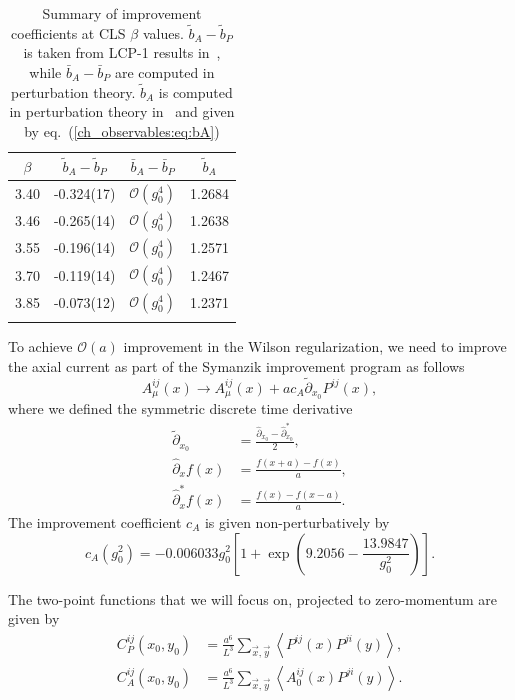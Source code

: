 \begin{longtable}{c c c c}
    \label{ch_observables:tab:b}
    $\beta$ & $\tilde{b}_A-\tilde{b}_P$ & $\bar{b}_A-\bar{b}_P$ & $\tilde{b}_A$ \\
    \toprule
    3.40 & -0.324(17) & $\mathcal{O}(g_0^4)$ & 1.2684 \\
    3.46 & -0.265(14) & $\mathcal{O}(g_0^4)$ & 1.2638 \\
    3.55 & -0.196(14) & $\mathcal{O}(g_0^4)$ & 1.2571 \\
    3.70 & -0.119(14) & $\mathcal{O}(g_0^4)$ & 1.2467 \\
    3.85 & -0.073(12) & $\mathcal{O}(g_0^4)$ & 1.2371 \\
    \bottomrule
    \caption{Summary of improvement coefficients at CLS $\beta$ values. $\tilde{b}_A-\tilde{b}_P$ is taken from LCP-1 results in~\citep{deDivitiis:2017vvw}, while $\bar{b}_A-\bar{b}_P$ are computed in perturbation theory. $\tilde{b}_A$ is computed in perturbation theory in~\citep{Taniguchi:1998pf} and given by eq.~(\ref{ch_observables:eq:bA})}
\end{longtable}

To achieve $\mathcal{O}(a)$ improvement in the Wilson regularization, we need to improve the axial current as part of the Symanzik improvement program as follows
\begin{equation}
\label{ch_observables:eq:axial_impr}
A_{\mu}^{ij}(x)\rightarrow A_{\mu}^{ij}(x)+ac_A\tilde{\partial}_{x_0}P^{ij}(x),
\end{equation}
where we defined the symmetric discrete time derivative
\begin{align}
\tilde{\partial}_{x_0}&=\frac{\hat{\partial}_{x_0}-\hat{\partial}_{x_0}^*}{2},\\
\hat{\partial}_{x}f(x)&=\frac{f(x+a)-f(x)}{a},\\
\hat{\partial}^*_{x}f(x)&=\frac{f(x)-f(x-a)}{a}.
\end{align}
The improvement coefficient $c_A$ is given non-perturbatively by~\citep{Bulava:2015bxa}
\begin{equation}
c_A(g_0^2)=-0.006033g_0^2\left[1+\exp\left(9.2056-\frac{13.9847}{g_0^2}\right)\right].
\end{equation}

The two-point functions that we will focus on, projected to zero-momentum are given by
\begin{align}
\label{ch_observables:eq:corrs}
C_P^{ij}(x_0,y_0)&=\frac{a^6}{L^3}\sum_{\vec{x},\vec{y}}\left<P^{ij}(x)P^{ji}(y)\right>,\\
C_A^{ij}(x_0,y_0)&=\frac{a^6}{L^3}\sum_{\vec{x},\vec{y}}\left<A_0^{ij}(x)P^{ji}(y)\right>.
\end{align}

